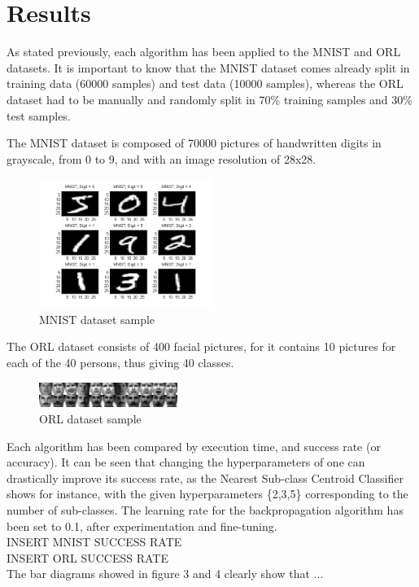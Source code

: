 \section{Results}
As stated previously, each algorithm has been applied to the MNIST and ORL datasets. It is important to know that the MNIST dataset comes already split in training data (60000 samples) and test data (10000 samples), whereas the ORL dataset had to be manually and randomly split in 70\% training samples and 30\% test samples.

The MNIST dataset is composed of 70000 pictures of handwritten digits in grayscale, from 0 to 9, and with an image resolution of 28x28.
\begin{figure}
  \centering
      \includegraphics[width=0.5\textwidth]{fig/mnist_example.png}
  \caption{MNIST dataset sample}
\end{figure}

 The ORL dataset consists of 400 facial pictures, for it contains 10 pictures for each of the 40 persons, thus giving 40 classes.
\begin{figure}
  \centering
  \includegraphics[width=0.4\textwidth]{fig/orl.jpg}
  \caption{ORL dataset sample}
\end{figure}

Each algorithm has been compared by execution time, and success rate (or accuracy). It can be seen that changing the hyperparameters of one can drastically improve its success rate, as the Nearest Sub-class Centroid Classifier shows for instance, with the given hyperparameters \{2,3,5\} corresponding to the number of sub-classes. The learning rate for the backpropagation algorithm has been set to 0.1, after experimentation and fine-tuning.
\\

INSERT MNIST SUCCESS RATE
\\

INSERT ORL SUCCESS RATE
\\

The bar diagrams showed in figure 3 and 4 clearly show that ...


